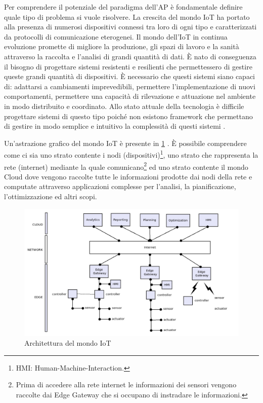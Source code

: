 \documentclass[12pt,a4paper,openright,twoside]{book}
\begin{document}
Per comprendere il potenziale del paradigma dell'\ac{AP} è fondamentale definire quale tipo di problema si vuole risolvere. La crescita del mondo \ac{IoT} ha portato alla presenza di numerosi dispositivi connessi tra loro di ogni tipo e caratterizzati da protocolli di comunicazione eterogenei. Il mondo dell'IoT in continua evoluzione promette di migliore la produzione, gli spazi di lavoro e la sanità attraverso la raccolta e l'analisi di grandi quantità di dati. È nato di conseguenza il bisogno di progettare sistemi resistenti e resilienti che permettessero di gestire queste grandi quantità di dispositivi. È necessario che questi sistemi siano capaci di: adattarsi a cambiamenti imprevedibili, permettere l'implementazione di nuovi comportamenti, permettere una capacità di rilevazione e attuazione nel ambiente in modo distribuito e coordinato. Allo stato attuale della tecnologia è difficile progettare sistemi di questo tipo poiché non esistono framework che permettano di gestire in modo semplice e intuitivo la complessità di questi sistemi \cite{Beal2015} \cite{CasadeiPhDThesis}.

Un'astrazione grafico del mondo IoT è presente in \cref{fig:iot-arc} \cite{Testa2022}. È possibile comprendere come ci sia uno strato contente i nodi (dispositivi)\footnote{HMI: Human-Machine-Interaction.}, uno strato che rappresenta la rete (internet) mediante la quale comunicano\footnote{Prima di accedere alla rete internet le informazioni dei sensori vengono raccolte dai Edge Gateway che si occupano di instradare le informazioni.} ed uno strato contente il mondo Cloud dove vengono raccolte tutte le informazioni prodotte dai nodi della rete e computate attraverso applicazioni complesse per l'analisi, la pianificazione, l'ottimizzazione ed altri scopi.

\begin{figure}
    \centering
    \includegraphics[width=.8\linewidth]{figures/iot-arc.png}
    \caption{Architettura del mondo IoT}
    \label{fig:iot-arc}
\end{figure}
\end{document}
